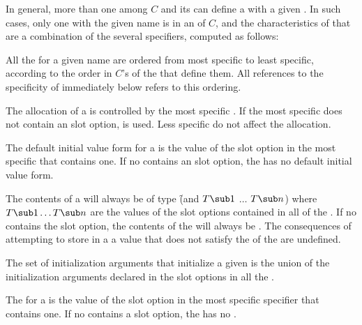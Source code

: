 In general, more than one  among $C$ and its 
 can
define a  with a given .  
In such cases, only one  with
the given name is  in an  
of $C$\negthinspace, and
the characteristics of that  are 
a combination of the several 
specifiers, computed as follows:

\beginlist

\itemitem{\bull} All the  for a given  name
are ordered from most specific to least specific, according to the order in $C$'s
 of the  that define them. All references
to the specificity of  immediately below refers to this
ordering.

\itemitem{\bull} The allocation of a  is controlled by the most 
specific .  If the most specific  
does not contain an  slot option,  is used.
Less specific  do not affect the allocation.

\itemitem{\bull} The default initial value form for a  
is the value of the  slot option in the most specific
 that contains one.  If no 
contains an  slot option, the  
has no default initial value form.

\itemitem{\bull} The contents of a  will always be of type 
\f{(and $T\sub 1$ $\ldots$ $T\sub n$)} where $T\sub 1 \ldots T\sub n$ are
the values of the  slot options contained in all of the
.  If no  contains the
 slot option, the contents of the  will always be 
. The consequences of attempting to store in a 
a value that does not satisfy the  of the  are undefined.

\itemitem{\bull} The set of initialization arguments that initialize a 
given  is the union of the initialization arguments declared in
the  slot options in all the .

\itemitem{\bull} The  for a  is the value of
the  slot option in the most specific 
specifier that contains one.  If no  contains a
 slot option, the  has no .

